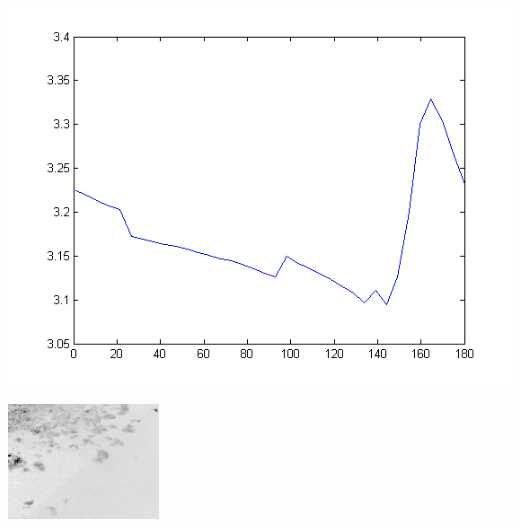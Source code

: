 \documentclass[red]{beamer}
\begin{document}
\begin{frame}
\centerline{\includegraphics[width=.9\linewidth]{./img/chromaticity1_theta}}
\end{frame}

\begin{frame}
\centerline{\includegraphics[width=.75\linewidth]{./img/intrinsic}}
\end{frame}
\end{document}
